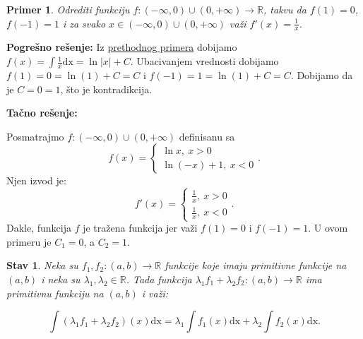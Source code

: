\documentclass{article}
\newtheorem{stav}{Stav}[section]
\newtheorem{prim}{Primer}[section]
\begin{document}
\begin{primbox}
    \label{primer_1.5}
    \begin{prim}
        Odrediti funkciju $f: \left(-\infty, 0\right)\cup\left(0, +\infty\right)
            \longrightarrow \mathbb{R}$, takvu da $f\left(1\right) = 0$,
        $f\left(-1\right) = 1$ i za svako $x \in \left(-\infty, 0\right)
            \cup\left(0, +\infty\right)$ važi
        $\displaystyle f'\left(x\right) = \frac{1}{x}$.
    \end{prim}
    \textbf{Pogrešno rešenje:} Iz \hyperref[primer_1.4]{prethodnog primera} dobijamo $\displaystyle f\left(x\right) = \int\frac{1}{x}\text{dx} = \ln|x| + C$. Ubacivanjem vrednosti
    dobijamo $f\left(1\right)  = 0 = \ln\left(1\right) + C=C$ i $f\left(-1\right) = 1 = \ln\left(1\right) + C =C$.
    Dobijamo da je $C=0=1$, što je kontradikcija.\par
    \textbf{Tačno rešenje:}\par
    Posmatrajmo $f: \left(-\infty, 0\right)\cup\left(0, +\infty\right)$
    definisanu sa
    $$
        f\left(x\right) =
        \begin{cases}
            \ln x,\ x > 0 \\
            \ln \left(-x\right) + 1,\ x < 0
        \end{cases}.
    $$
    Njen izvod je:
    $$f'\left(x\right) =
        \begin{cases}
            \frac{1}{x},\ x > 0 \\
            \frac{1}{x},\ x < 0
        \end{cases}.
    $$
    Dakle, funkcija $f$ je tražena funkcija jer važi
    $f\left(1\right) = 0$ i $f\left(-1\right) = 1$. U ovom primeru je $C_1=0$, a $C_2=1$.
\end{primbox}

\begin{stavbox}
    \label{stav_1.2}
    \begin{stav}
        Neka su $f_1, f_2 : \left(a, b\right) \longrightarrow \mathbb{R}$
        funkcije koje imaju primitivne funkcije na $\left(a, b\right)$ i neka
        su $\lambda_1 , \lambda_2 \in \mathbb{R}$. Tada funkcija
        $\lambda_1 f_1 + \lambda_2 f_2 : \left(a, b\right) \longrightarrow
            \mathbb{R}$ ima primitivnu funkciju na $\left(a, b\right)$ i važi:\par
        $$\int \left(\lambda_1 f_1 + \lambda_2 f_2\right)\left(x\right)\text{dx} = \lambda_1\int
            f_1\left(x\right) \text{dx} + \lambda_2\int f_2\left(x\right) \text{dx}.$$
    \end{stav}
\end{stavbox}
\end{document}
